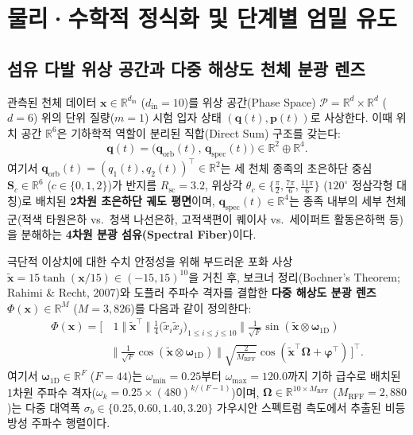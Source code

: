 \documentclass[11pt,a4paper]{article}
\begin{document}
\section{물리·수학적 정식화 및 단계별 엄밀 유도}

\subsection{섬유 다발 위상 공간과 다중 해상도 천체 분광 렌즈}

관측된 천체 데이터 $\mathbf{x} \in \mathbb{R}^{d_{\text{in}}}$ ($d_{\text{in}}=10$)를 위상 공간(Phase Space) $\mathcal{P} = \mathbb{R}^d \times \mathbb{R}^d$ ($d = 6$) 위의 단위 질량($m = 1$) 시험 입자 상태 $(\mathbf{q}(t), \mathbf{p}(t))$로 사상한다. 이때 위치 공간 $\mathbb{R}^6$은 기하학적 역할이 분리된 직합(Direct Sum) 구조를 갖는다:
\begin{equation}
  \mathbf{q}(t) = \big(\mathbf{q}_{\text{orb}}(t),\, \mathbf{q}_{\text{spec}}(t)\big) \in \mathbb{R}^2 \oplus \mathbb{R}^4.
\end{equation}
여기서 $\mathbf{q}_{\text{orb}}(t) = (q_1(t), q_2(t))^\top \in \mathbb{R}^2$는 세 천체 종족의 초은하단 중심 $\mathbf{S}_c \in \mathbb{R}^6$ ($c \in \{0, 1, 2\}$)가 반지름 $R_{\text{sc}} = 3.2$, 위상각 $\theta_c \in \{\frac{\pi}{2}, \frac{7\pi}{6}, \frac{11\pi}{6}\}$ ($120^\circ$ 정삼각형 대칭)로 배치된 \textbf{2차원 초은하단 궤도 평면}이며, $\mathbf{q}_{\text{spec}}(t) \in \mathbb{R}^4$는 종족 내부의 세부 천체군(적색 타원은하 vs.\ 청색 나선은하, 고적색편이 퀘이사 vs.\ 세이퍼트 활동은하핵 등)을 분해하는 \textbf{4차원 분광 섬유(Spectral Fiber)}이다.

극단적 이상치에 대한 수치 안정성을 위해 부드러운 포화 사상 $\tilde{\mathbf{x}} = 15 \tanh(\mathbf{x} / 15) \in (-15, 15)^{10}$을 거친 후, 보크너 정리(Bochner's Theorem; Rahimi \& Recht, 2007)와 도플러 주파수 격자를 결합한 \textbf{다중 해상도 분광 렌즈} $\Phi(\mathbf{x}) \in \mathbb{R}^M$ ($M = 3,826$)를 다음과 같이 정의한다:
\begin{equation}
\begin{aligned}
  \Phi(\mathbf{x}) = \Big[\, &1 \;\Big\Vert\; \tilde{\mathbf{x}}^\top \;\Big\Vert\; \tfrac{1}{4}\big(\tilde{x}_i \tilde{x}_j\big)_{1 \le i \le j \le 10} \;\Big\Vert\; \tfrac{1}{\sqrt{F}}\sin(\tilde{\mathbf{x}} \otimes \boldsymbol{\omega}_{\text{1D}}) \\
  &\Big\Vert\; \tfrac{1}{\sqrt{F}}\cos(\tilde{\mathbf{x}} \otimes \boldsymbol{\omega}_{\text{1D}}) \;\Big\Vert\; \sqrt{\tfrac{2}{M_{\text{RFF}}}}\cos(\tilde{\mathbf{x}}^\top \boldsymbol{\Omega} + \boldsymbol{\varphi}^\top) \,\Big]^\top.
\end{aligned}
\end{equation}
여기서 $\boldsymbol{\omega}_{\text{1D}} \in \mathbb{R}^F$ ($F=44$)는 $\omega_{\min}=0.25$부터 $\omega_{\max}=120.0$까지 기하 급수로 배치된 1차원 주파수 격자($\omega_k = 0.25 \times (480)^{k/(F-1)}$)이며, $\boldsymbol{\Omega} \in \mathbb{R}^{10 \times M_{\text{RFF}}}$ ($M_{\text{RFF}}=2,880$)는 다중 대역폭 $\sigma_b \in \{0.25, 0.60, 1.40, 3.20\}$ 가우시안 스펙트럼 측도에서 추출된 비등방성 주파수 행렬이다.
\end{document}
